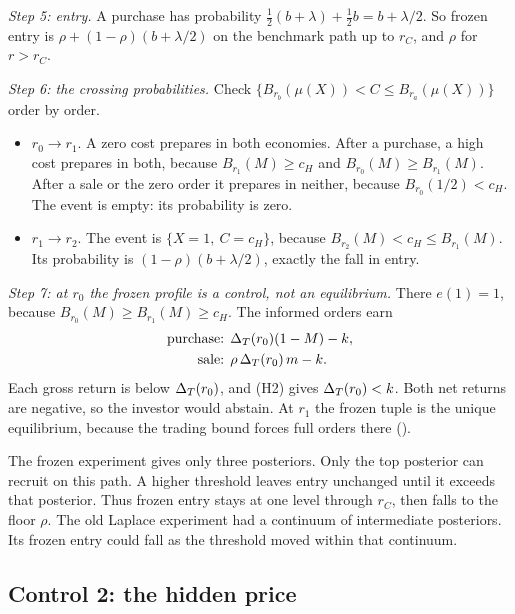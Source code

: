 \emph{Step 5: entry.} A purchase has probability \(\tfrac12(b+\lambda)+\tfrac12b=b+\lambda/2\). So frozen
entry is \(\rho+(1-\rho)(b+\lambda/2)\) on the benchmark path up to \(r_C\), and \(\rho\) for \(r>r_C\).

\emph{Step 6: the crossing probabilities.} Check \(\{B_{r_b}(\mu(X))<C\le B_{r_a}(\mu(X))\}\) order by order.
\begin{itemize}[leftmargin=2em]
\item \(r_0\to r_1\). A zero cost prepares in both economies. After a purchase, a high cost prepares in both, because
\(B_{r_1}(M)\ge c_H\) and \(B_{r_0}(M)\ge B_{r_1}(M)\). After a sale or the zero order it prepares in neither, because
\(B_{r_0}(1/2)<c_H\). The event is empty: its probability is zero.
\item \(r_1\to r_2\). The event is \(\{X=1,\ C=c_H\}\), because \(B_{r_2}(M)<c_H\le
B_{r_1}(M)\). Its probability is \((1-\rho)(b+\lambda/2)\), exactly the fall in entry.
\end{itemize}

\emph{Step 7: at \(r_0\) the frozen profile is a control, not an equilibrium.} There \(e(1)=1\), because
\(B_{r_0}(M)\ge B_{r_1}(M)\ge c_H\). The informed orders earn
\begin{align*}
\text{purchase: }&\Delta_T(r_0)(1-M)-k,\\
\text{sale: }&\rho\,\Delta_T(r_0)\,m-k.
\end{align*}
Each gross return is below \(\Delta_T(r_0)\), and (H2) gives \(\Delta_T(r_0)<k\). Both net returns are negative, so the investor
would abstain. At \(r_1\) the frozen tuple is the unique equilibrium, because the
trading bound forces full orders there ().

\begin{panelnote}
The frozen experiment gives only three posteriors.
Only the top posterior can recruit on this path.
A higher threshold leaves entry unchanged until it exceeds that posterior.
Thus frozen entry stays at one level through \(r_C\), then falls to the floor \(\rho\).
The old Laplace experiment had a continuum of intermediate posteriors.
Its frozen entry could fall as the threshold moved within that continuum.
\end{panelnote}

\subsection{Control 2: the hidden price}\label{sec:07_controls-hidden}

